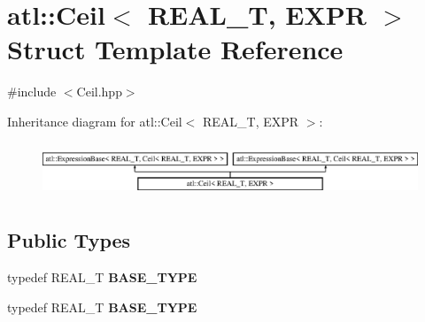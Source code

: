 \hypertarget{structatl_1_1_ceil}{\section{atl\+:\+:Ceil$<$ R\+E\+A\+L\+\_\+\+T, E\+X\+P\+R $>$ Struct Template Reference}
\label{structatl_1_1_ceil}
}


{\ttfamily \#include $<$Ceil.\+hpp$>$}

Inheritance diagram for atl\+:\+:Ceil$<$ R\+E\+A\+L\+\_\+\+T, E\+X\+P\+R $>$\+:\begin{figure}[H]
\begin{center}
\leavevmode
\includegraphics[height=1.637427cm]{structatl_1_1_ceil}
\end{center}
\end{figure}
\subsection*{Public Types}
\begin{DoxyCompactItemize}
\item 
\hypertarget{structatl_1_1_ceil_a464fcdf62a13706c4b9d1b66f0c40c2d}{typedef R\+E\+A\+L\+\_\+\+T {\bfseries B\+A\+S\+E\+\_\+\+T\+Y\+P\+E}}\label{structatl_1_1_ceil_a464fcdf62a13706c4b9d1b66f0c40c2d}

\item 
\hypertarget{structatl_1_1_ceil_a464fcdf62a13706c4b9d1b66f0c40c2d}{typedef R\+E\+A\+L\+\_\+\+T {\bfseries B\+A\+S\+E\+\_\+\+T\+Y\+P\+E}}\label{structatl_1_1_ceil_a464fcdf62a13706c4b9d1b66f0c40c2d}

\end{DoxyCompactItemize}
